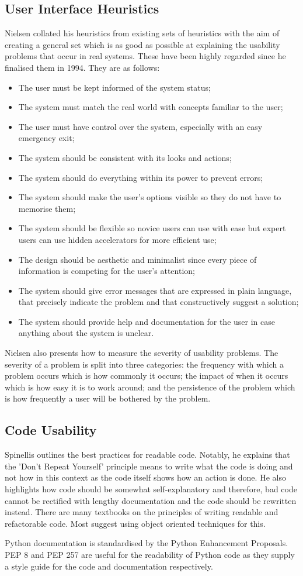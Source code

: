 		\subsection{User Interface Heuristics}
			Nielsen collated his heuristics from existing sets of heuristics with the aim of creating a general set which is as good as possible at explaining the usability problems that occur in real systems\cite{usability_heuristics_nielsen}. These have been highly regarded since he finalised them in 1994. They are as follows: 
			\begin{itemize}
				\item The user must be kept informed of the system status;
				\item The system must match the real world with concepts familiar to the user;  
				\item The user must have control over the system, especially with an easy emergency exit; 
				\item The system should be consistent with its looks and actions;
				\item The system should do everything within its power to prevent errors;
				\item The system should make the user's options visible so they do not have to memorise them;
				\item The system should be flexible so novice users can use with ease but expert users can use hidden accelerators for more efficient use;
				\item The design should be aesthetic and minimalist since every piece of information is competing for the user's attention;
				\item The system should give error messages that are expressed in plain language, that precisely indicate the problem and that constructively suggest a solution;
				\item The system should provide help and documentation for the user in case anything about the system is unclear. 
			\end{itemize}

			Nielsen also presents how to measure the severity of usability problems. The severity of a problem is split into three categories: the frequency with which a problem occurs which is how commonly it occurs; the impact of when it occurs which is how easy it is to work around; and the persistence of the problem which is how frequently a user will be bothered by the problem. 
		\subsection{Code Usability}
			Spinellis outlines the best practices for readable code\cite{code_documentation_spinellis}. Notably, he explains that the 'Don't Repeat Yourself' principle means to write what the code is doing and not how in this context as the code itself shows how an action is done. He also highlights how code should be somewhat self-explanatory and therefore, bad code cannot be rectified with lengthy documentation and the code should be rewritten instead. There are many textbooks on the principles of writing readable and refactorable code. Most suggest using object oriented techniques for this\cite{software_craftsmanship_martin}.  

			Python documentation is standardised by the Python Enhancement Proposals. PEP 8 and PEP 257 are useful for the readability of Python code as they supply a style guide for the code and documentation respectively\cite{pep_guido}. 